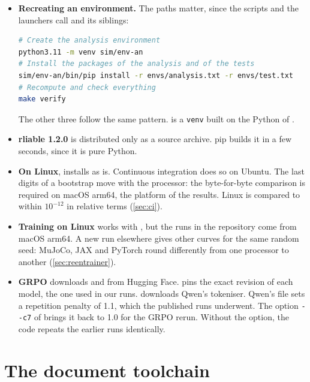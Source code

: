 \begin{itemize}
  \item \textbf{Recreating an environment.} The paths matter, since the scripts and the launchers
        call  and its siblings:
\begin{lstlisting}[language=bash]
# Create the analysis environment
python3.11 -m venv sim/env-an
# Install the packages of the analysis and of the tests
sim/env-an/bin/pip install -r envs/analysis.txt -r envs/test.txt
# Recompute and check everything
make verify
\end{lstlisting}
        The other three follow the same pattern.  is a \texttt{venv} built on the
        Python of .
  \item \textbf{rliable 1.2.0} is distributed only as a source archive. pip builds it in a few
        seconds, since it is pure Python.
  \item \textbf{On Linux},  installs as is. Continuous integration does so on
        Ubuntu. The last digits of a bootstrap move with the processor: the byte-for-byte comparison
        is required on macOS arm64, the platform of the results. Linux is compared to within
        $10^{-12}$ in relative terms (\cref{sec:ci}).
  \item \textbf{Training on Linux} works with , but the runs in the repository come
        from macOS arm64. A new run elsewhere gives other curves for the same random seed: MuJoCo,
        JAX and PyTorch round differently from one processor to another (\cref{sec:reentrainer}).
  \item \textbf{GRPO} downloads  and
         from Hugging Face.  pins the exact revision of each model, the one used in our runs.
         downloads Qwen's tokeniser. Qwen's file
         sets a repetition penalty of 1.1, which the published runs
        underwent. The option \texttt{-{}-c7} of 
        brings it back to 1.0 for the GRPO rerun. Without the option, the code repeats
        the earlier runs identically.
\end{itemize}

\section{The document toolchain}
\label{sec:d-chaine}

